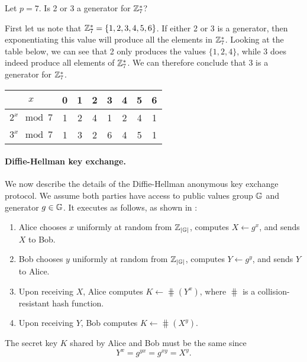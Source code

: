 \begin{example}
	Let $p=7$. Is 2 or 3 a generator for ${{\mathbb Z}}_7^*$?
	
	First let us note that ${{\mathbb Z}}_7^* = \{1,2,3,4,5,6\}$. If either 2 or 3 is a generator, then exponentiating this value will produce all the elements in ${{\mathbb Z}}_7^*$. Looking at the table below, we can see that 2 only produces the values $\{1,2,4\}$, while 3 does indeed produce all elements of ${{\mathbb Z}}_7^*$. We can therefore conclude that 3 is a generator for ${{\mathbb Z}}_7^*$. 
	\begin{center}
	\begin{tabular}{|c|c|c|c|c|c|c|c|}
		\hline
		$x$ & 0 & 1 & 2 & 3 & 4 & 5 & 6 \\
		\hline \hline
		$2^x \mod 7$ & 1 & 2 & 4 & 1 & 2 & 4 & 1 \\
		\hline
		$3^x \mod 7$ & 1 & 3 & 2 & 6 & 4 & 5 & 1 \\
		\hline
	\end{tabular}
	\end{center}
\end{example}

\paragraph{Diffie-Hellman key exchange.} We now describe the details of the Diffie-Hellman anonymous key exchange protocol. We assume both parties have access to public values group $\mathbb{G}$ and generator $g\in\mathbb{G}$. It executes as follows, as shown in :
\begin{enumerate}
	\item Alice chooses $x$ uniformly at random from ${{\mathbb Z}}_{|\mathbb{G}|}$, computes $X \gets g^x$, and sends $X$ to Bob.
	
	\item Bob chooses $y$ uniformly at random from ${{\mathbb Z}}_{|\mathbb{G}|}$, computes $Y \gets g^y$, and sends $Y$ to Alice.
	
	\item Upon receiving $X$, Alice computes $K \gets \hash(Y^x)$, where $\hash$ is a collision-resistant hash function. 
	
	\item Upon receiving $Y$, Bob computes $K \gets \hash(X^y)$. 
\end{enumerate}

The secret key $K$ shared by Alice and Bob must be the same since
\begin{equation*}
	Y^x = g^{yx} = g^{xy} = X^y.
\end{equation*}

